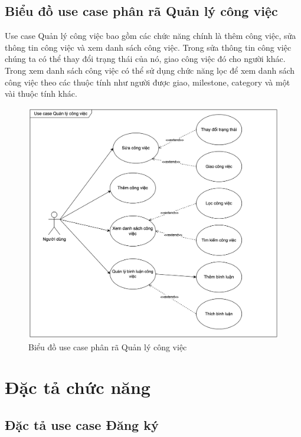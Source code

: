 \documentclass[../DoAn.tex]{subfiles}
\begin{document}
\subsection{Biểu đồ use case phân rã Quản lý công việc}
\label{subsection:2.2.5}
Use case Quản lý công việc bao gồm các chức năng chính là thêm công việc, sửa thông tin công việc và xem danh sách công việc.
Trong sửa thông tin công việc chúng ta có thể thay đổi trạng thái của nó, giao công việc đó cho người khác.
Trong xem danh sách công việc có thể sử dụng chức năng lọc để xem danh sách công việc theo các thuộc tính như người được giao, milestone,
category và một vài thuộc tính khác.
\begin{figure}[H]
    \centering
    \includegraphics[width=1.0\linewidth]{Hinhve/TaskUseCases.png}
    \caption{Biểu đồ use case phân rã Quản lý công việc}
    \label{fig:TaskUseCases}
\end{figure}
\newpage

\section{Đặc tả chức năng}
\label{section:2.3}

\subsection{Đặc tả use case Đăng ký}
\label{subsection:2.3.1}
\end{document}
